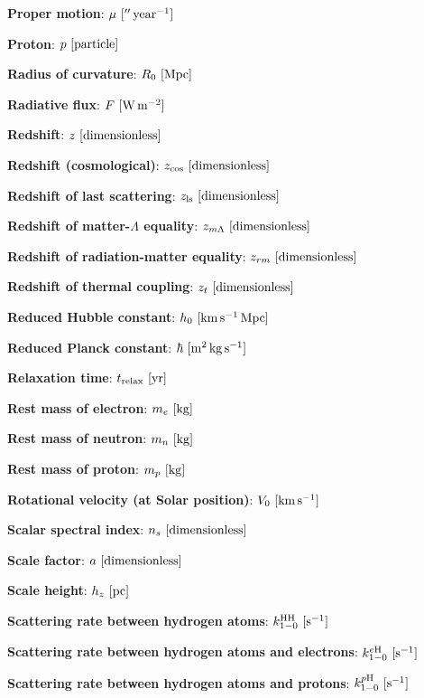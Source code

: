 \documentclass[a4paper,11pt]{article}
\begin{document}
{\noindent}\textbf{Proper motion}: $\mu ~ [{\rm ''\,year^{-1}}]$

{\noindent}\textbf{Proton}: $p ~ [{\rm particle}]$

{\noindent}\textbf{Radius of curvature}: $R_0 ~ [{\rm Mpc}]$

{\noindent}\textbf{Radiative flux}: $F ~ [{\rm W\,m^{-2}}]$

{\noindent}\textbf{Redshift}: $z ~ [{\rm dimensionless}]$

{\noindent}\textbf{Redshift (cosmological)}: $z_\mathrm{cos} ~ [{\rm dimensionless}]$

{\noindent}\textbf{Redshift of last scattering}: $z_\mathrm{ls} ~ [{\rm dimensionless}]$

{\noindent}\textbf{Redshift of matter-$\Lambda$ equality}: $z_{m\Lambda} ~ [{\rm dimensionless}]$

{\noindent}\textbf{Redshift of radiation-matter equality}: $z_{rm} ~ [{\rm dimensionless}]$

{\noindent}\textbf{Redshift of thermal coupling}: $z_t ~ [{\rm dimensionless}]$

{\noindent}\textbf{Reduced Hubble constant}: $h_0 ~ [{\rm km\,s^{-1}\,Mpc}]$

{\noindent}\textbf{Reduced Planck constant}: $\hbar ~ [{\rm m^2\,kg\,s^{-1}}]$

{\noindent}\textbf{Relaxation time}: $t_\mathrm{relax} ~ [{\rm yr}]$

{\noindent}\textbf{Rest mass of electron}: $m_e ~ [{\rm kg}]$

{\noindent}\textbf{Rest mass of neutron}: $m_n ~ [{\rm kg}]$

{\noindent}\textbf{Rest mass of proton}: $m_p ~ [{\rm kg}]$

{\noindent}\textbf{Rotational velocity (at Solar position)}: $V_0 ~ [{\rm km\,s^{-1}}]$

{\noindent}\textbf{Scalar spectral index}: $n_s ~ [{\rm dimensionless}]$

{\noindent}\textbf{Scale factor}: $a ~ [{\rm dimensionless}]$

{\noindent}\textbf{Scale height}: $h_z ~ [{\rm pc}]$

{\noindent}\textbf{Scattering rate between hydrogen atoms}: $k_{1-0}^\mathrm{HH} ~ [{\rm s^{-1}}]$

{\noindent}\textbf{Scattering rate between hydrogen atoms and electrons}: $k_{1-0}^{e\mathrm{H}} ~ [{\rm s^{-1}}]$

{\noindent}\textbf{Scattering rate between hydrogen atoms and protons}: $k_{1-0}^{p\mathrm{H}} ~ [{\rm s^{-1}}]$
\end{document}
